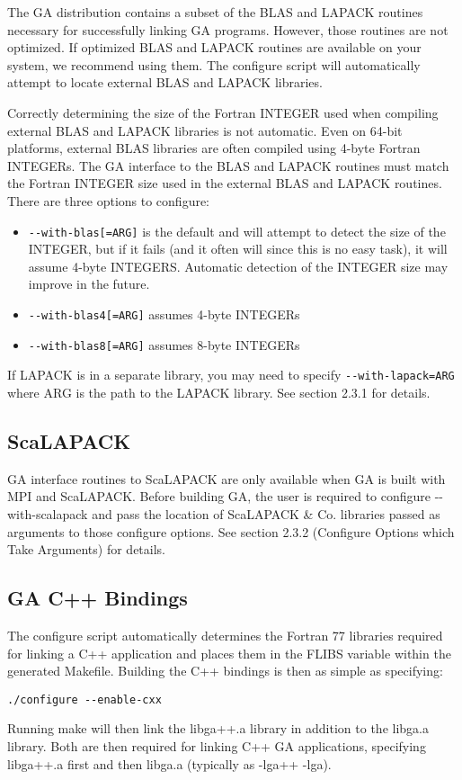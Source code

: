 The GA distribution contains a subset of the BLAS and LAPACK routines necessary
for successfully linking GA programs. However, those routines are not
optimized. If optimized BLAS and LAPACK routines are available on your system,
we recommend using them. The configure script will automatically attempt to
locate external BLAS and LAPACK libraries. 

Correctly determining the size of the Fortran INTEGER used when compiling
external BLAS and LAPACK libraries is not automatic. Even on 64-bit platforms,
external BLAS libraries are often compiled using 4-byte Fortran INTEGERs. The
GA interface to the BLAS and LAPACK routines must match the Fortran INTEGER
size used in the external BLAS and LAPACK routines. There are three options to
configure: 
\begin{itemize}
\item \texttt{-{}-with-blas{[}=ARG{]}} is the default and will attempt to
detect the size of the INTEGER, but if it fails (and it often will since this
is no easy task), it will assume 4-byte INTEGERS. Automatic detection of the
INTEGER size may improve in the future.
\item \texttt{-{}-with-blas4{[}=ARG{]}} assumes 4-byte INTEGERs 
\item \texttt{-{}-with-blas8{[}=ARG{]}} assumes 8-byte INTEGERs 
\end{itemize}
If LAPACK is in a separate library, you may need to specify
\texttt{-{}-with-lapack=ARG} where ARG is the path to the LAPACK library. See
section 2.3.1 for details. 

\subsection{ScaLAPACK}

GA interface routines to ScaLAPACK are only available when GA is built with MPI
and ScaLAPACK. Before building GA, the user is required to configure
-{}-with-scalapack and pass the location of ScaLAPACK \& Co. libraries passed
as arguments to those configure options. See section 2.3.2 (Configure Options
which Take Arguments) for details. 

\subsection{GA C++ Bindings}

The configure script automatically determines the Fortran 77 libraries required
for linking a C++ application and places them in the FLIBS variable within the
generated Makefile. Building the C++ bindings is then as simple as specifying: 
\begin{verbatim}
./configure --enable-cxx
\end{verbatim}
Running make will then link the libga++.a library in addition to the libga.a
library. Both are then required for linking C++ GA applications, specifying
libga++.a first and then libga.a (typically as -lga++ -lga). 

